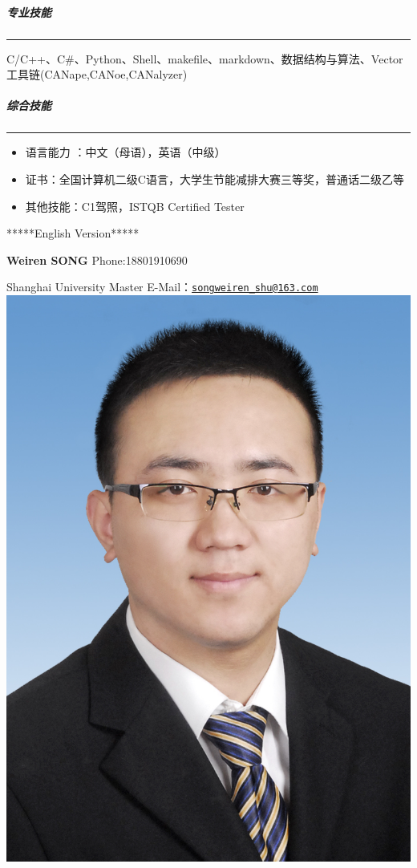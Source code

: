 \documentclass[
]{article}
\begin{document}
\begin{CJK}{UTF8}{gbsn}
\hypertarget{ux4e13ux4e1aux6280ux80fd}{%
\subparagraph{专业技能}\label{ux4e13ux4e1aux6280ux80fd}}

\begin{center}\rule{0.5\linewidth}{0.5pt}\end{center}

C/C++、C\#、Python、Shell、makefile、markdown、数据结构与算法、Vector工具链(CANape,CANoe,CANalyzer)

\hypertarget{ux7efcux5408ux6280ux80fd}{%
\subparagraph{综合技能}\label{ux7efcux5408ux6280ux80fd}}

\begin{center}\rule{0.5\linewidth}{0.5pt}\end{center}

\begin{itemize}
\item
  语言能力 ：中文（母语），英语（中级）
\item
  证书：全国计算机二级C语言，大学生节能减排大赛三等奖，普通话二级乙等
\item
  其他技能：C1驾照，ISTQB Certified Tester
\end{itemize}

*****English Version*****

\textbf{Weiren SONG} Phone:18801910690

Shanghai University\textbar{} Master
E-Mail：\href{mailto:songweiren_shu@163.com}{\nolinkurl{songweiren\_shu@163.com}}
\includegraphics{./image/header.jpg}


\end{CJK}
\end{document}
